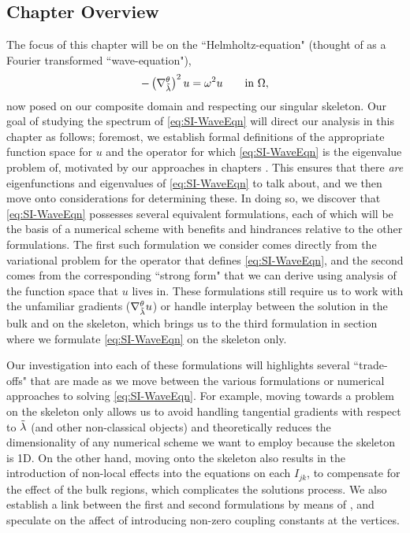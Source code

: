\subsection{Chapter Overview} \label{ssec:SIOverview}
The focus of this chapter will be on the ``Helmholtz-equation" (thought of as a Fourier transformed ``wave-equation"),
\begin{align} \label{eq:SI-WaveEqn}
	-\left( \nabla^{\theta}_{\tilde{\lambda}} \right)^2 u = \omega^2 u \qquad\text{in } \Omega,
\end{align}
now posed on our composite domain and respecting our singular skeleton.
Our goal of studying the spectrum of \eqref{eq:SI-WaveEqn} will direct our analysis in this chapter as follows; foremost,  we establish formal definitions of the appropriate function space for $u$ and the operator for which \eqref{eq:SI-WaveEqn} is the eigenvalue problem of, motivated by our approaches in chapters .
This ensures that there \emph{are} eigenfunctions and eigenvalues of \eqref{eq:SI-WaveEqn} to talk about, and we then move onto considerations for determining these.
In doing so, we discover that \eqref{eq:SI-WaveEqn} possesses several equivalent formulations, each of which will be the basis of a numerical scheme with benefits and hindrances relative to the other formulations.
The first such formulation we consider   comes directly from the variational problem for the operator that defines \eqref{eq:SI-WaveEqn}, and the second comes from the corresponding ``strong form" that we can derive using analysis of the function space that $u$ lives in.
These formulations still require us to work with the unfamiliar gradients ($\nabla^{\theta}_{\tilde{\lambda}}u$) or handle interplay between the solution in the bulk and on the skeleton, which brings us to the third formulation in section  where we formulate \eqref{eq:SI-WaveEqn} on the skeleton only.

Our investigation into each of these formulations will highlights several ``trade-offs" that are made as we move between the various formulations or numerical approaches to solving \eqref{eq:SI-WaveEqn}.
For example, moving towards a problem on the skeleton only allows us to avoid handling tangential gradients with respect to $\tilde{\lambda}$ (and other non-classical objects) and theoretically reduces the dimensionality of any numerical scheme we want to employ because the skeleton is 1D.
On the other hand, moving onto the skeleton also results in the introduction of non-local effects into the equations on each $I_{jk}$, to compensate for the effect of the bulk regions, which complicates the solutions process.
We also establish a link between the first and second formulations by means of , and speculate on the affect of introducing non-zero coupling constants at the vertices.